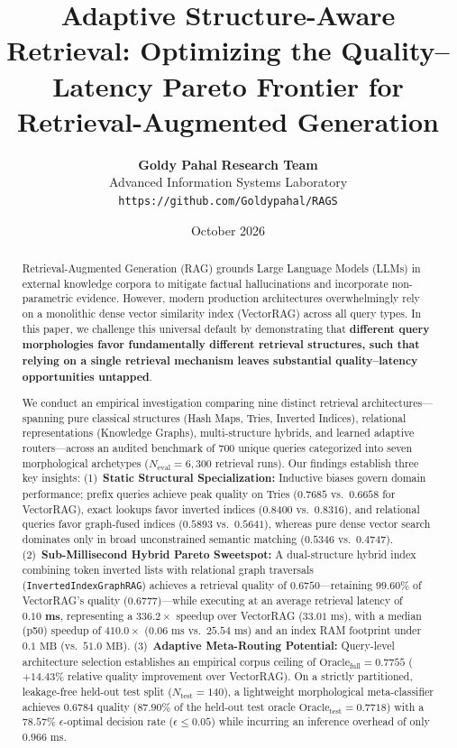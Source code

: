 \documentclass[10pt,twocolumn,letterpaper]{article}
\title{\textbf{Adaptive Structure-Aware Retrieval: Optimizing the Quality--Latency Pareto Frontier for Retrieval-Augmented Generation}}
\author{
  \textbf{Goldy Pahal} \qquad \textbf{Research Team} \\
  Advanced Information Systems Laboratory \\
  \texttt{https://github.com/Goldypahal/RAGS}
}
\date{October 2026}
\begin{document}
\maketitle

\begin{abstract}
Retrieval-Augmented Generation (RAG) grounds Large Language Models (LLMs) in external knowledge corpora to mitigate factual hallucinations and incorporate non-parametric evidence. However, modern production architectures overwhelmingly rely on a monolithic dense vector similarity index (VectorRAG) across all query types. In this paper, we challenge this universal default by demonstrating that \textbf{different query morphologies favor fundamentally different retrieval structures, such that relying on a single retrieval mechanism leaves substantial quality--latency opportunities untapped}. 

We conduct an empirical investigation comparing nine distinct retrieval architectures---spanning pure classical structures (Hash Maps, Tries, Inverted Indices), relational representations (Knowledge Graphs), multi-structure hybrids, and learned adaptive routers---across an audited benchmark of 700 unique queries categorized into seven morphological archetypes ($N_{\text{eval}} = 6{,}300$ retrieval runs). Our findings establish three key insights:
(1)~\textbf{Static Structural Specialization:} Inductive biases govern domain performance; prefix queries achieve peak quality on Tries ($0.7685$ vs.~$0.6658$ for VectorRAG), exact lookups favor inverted indices ($0.8400$ vs.~$0.8316$), and relational queries favor graph-fused indices ($0.5893$ vs.~$0.5641$), whereas pure dense vector search dominates only in broad unconstrained semantic matching ($0.5346$ vs.~$0.4747$).
(2)~\textbf{Sub-Millisecond Hybrid Pareto Sweetspot:} A dual-structure hybrid index combining token inverted lists with relational graph traversals (\texttt{InvertedIndexGraphRAG}) achieves a retrieval quality of $0.6750$---retaining $99.60\%$ of VectorRAG's quality ($0.6777$)---while executing at an average retrieval latency of $\mathbf{0.10\text{ ms}}$, representing a $\mathbf{336.2\times}$ speedup over VectorRAG ($33.01\text{ ms}$), with a median (p50) speedup of $\mathbf{410.0\times}$ ($0.06\text{ ms}$ vs.~$25.54\text{ ms}$) and an index RAM footprint under $0.1\text{ MB}$ (vs.~$51.0\text{ MB}$).
(3)~\textbf{Adaptive Meta-Routing Potential:} Query-level architecture selection establishes an empirical corpus ceiling of $\text{Oracle}_{\text{full}} = 0.7755$ ($+14.43\%$ relative quality improvement over VectorRAG). On a strictly partitioned, leakage-free held-out test split ($N_{\text{test}} = 140$), a lightweight morphological meta-classifier achieves $0.6784$ quality ($87.90\%$ of the held-out test oracle $\text{Oracle}_{\text{test}} = 0.7718$) with a $78.57\%$ $\epsilon$-optimal decision rate ($\epsilon \le 0.05$) while incurring an inference overhead of only $0.966\text{ ms}$.


\end{abstract}
\end{document}
